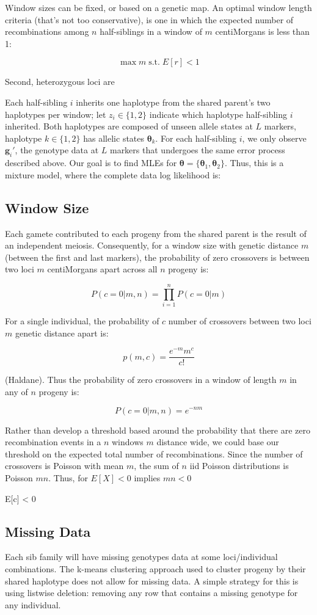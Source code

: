 \documentclass[11pt]{article}
\begin{document}
Window sizes can be fixed, or based on a genetic map. An
optimal window length criteria (that's not too conservative), is one in which
the expected number of recombinations among $n$ half-siblings in a window of
$m$ centiMorgans is less than 1:

$$\max m \; \text{s.t.} \; E[r] < 1$$


Second, heterozygous loci are 


Each half-sibling $i$ inherits one haplotype from the shared parent's two
haplotypes per window; let $z_i \in \{1, 2\}$ indicate which haplotype
half-sibling $i$ inherited. Both haplotypes are composed of unseen allele
states at $L$ markers, haplotype $k \in \{1, 2\}$ has allelic states
$\bm{\theta}_k$. For each half-sibling $i$, we only observe $\bm{g}_i'$, the
genotype data at $L$ markers that undergoes the same error process described
above. Our goal is to find MLEs for $\bm{\theta} = \{\bm{\theta}_1,
\bm{\theta}_2\}$. Thus, this is a mixture model, where the complete data log
likelihood is:

\subsection{Window Size}

Each gamete contributed to each progeny from the shared parent is the
result of an independent meiosis. Consequently, for a window size with genetic
distance $m$ (between the first and last markers), the probability of zero
crossovers is between two loci $m$ centiMorgans apart across all $n$ progeny
is:

$$
P(c = 0 | m, n) = \prod_{i=1}^n P(c = 0 | m)
$$

For a single individual, the probability of $c$ number of crossovers between
two loci $m$ genetic distance apart is:

$$
p(m, c) = \frac{e^{-m}m^c}{c!}
$$

(Haldane). Thus the probability of zero crossovers in a window of length $m$ in
any of $n$ progeny is:

$$
P(c = 0 | m, n) = e^{-nm}
$$

Rather than develop a threshold based around the probability that there are
zero recombination events in a $n$ windows $m$ distance wide, we could base our
threshold on the expected total number of recombinations. Since the number of
crossovers is Poisson with mean $m$, the sum of $n$ iid Poisson distributions
is Poisson $mn$. Thus, for $E[X] < 0$ implies $mn < 0$

E[c] < 0


\subsection{Missing Data}

Each sib family will have missing genotypes data at some loci/individual
combinations. The k-means clustering approach used to cluster progeny by their
shared haplotype does not allow for missing data. A simple strategy for this is
using listwise deletion: removing any row that contains a missing genotype for
any individual.




\end{document}
